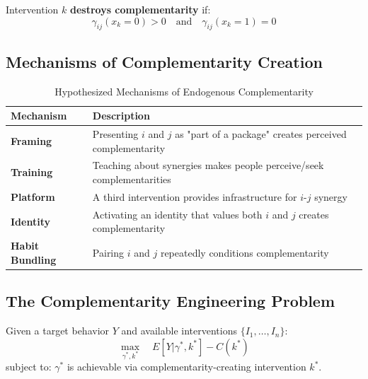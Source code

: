 \begin{definition}
Intervention $k$ \textbf{destroys complementarity} if:
\begin{equation}
\gamma_{ij}(x_k = 0) > 0 \quad \text{and} \quad \gamma_{ij}(x_k = 1) = 0
\end{equation}
\end{definition}

\subsection{Mechanisms of Complementarity Creation}

\begin{table}[h]
\centering
\caption{Hypothesized Mechanisms of Endogenous Complementarity}
\label{tab:endo-mechanisms}
\renewcommand{\arraystretch}{1.3}
\begin{tabular}{@{}lp{8cm}@{}}
\toprule
\textbf{Mechanism} & \textbf{Description} \\
\midrule
\textbf{Framing} & Presenting $i$ and $j$ as "part of a package" creates perceived complementarity \\
\textbf{Training} & Teaching about synergies makes people perceive/seek complementarities \\
\textbf{Platform} & A third intervention provides infrastructure for $i$-$j$ synergy \\
\textbf{Identity} & Activating an identity that values both $i$ and $j$ creates complementarity \\
\textbf{Habit Bundling} & Pairing $i$ and $j$ repeatedly conditions complementarity \\
\bottomrule
\end{tabular}
\end{table}

\subsection{The Complementarity Engineering Problem}

\begin{problem}
Given a target behavior $Y$ and available interventions $\{I_1, \ldots, I_n\}$:
\begin{equation}
\max_{\gamma^*, k^*} \quad E[Y | \gamma^*, k^*] - C(k^*)
\end{equation}
subject to: $\gamma^*$ is achievable via complementarity-creating intervention $k^*$.
\end{problem}

